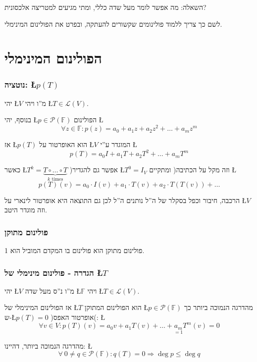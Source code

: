 \documentclass[english,hebrew]{article}
\begin{document}
השאלה: מה אפשר לומר מעל שדה כללי, ומתי מגיעים למטריצה אלכסונית?

לשם כך צריך ללמוד פולינומים שקשורים להעתקה, ובפרט את הפולינום המינימלי.

\part{הפולינום המינימלי}

\section{נוטציה: \L{$p(T)$}}

יהי \L{$V$} מ\textquotedblright ו ויהי \L{$T\in\mathcal{L}(V)$}.

בנוסף, יהי \L{$p\in\mathcal{P}(\mathbb{F})$} הפולינום \L{%
\[
\forall z\in\mathbb{F}:p(z)=a_{0}+a_{1}z+a_{2}z^{2}+\dots+a_{m}z^{m}
\]
}%

אז \L{$p(T)$} הוא האופרטור על \L{$V$} המוגדר ע\textquotedblright י
\L{%
\[
p(T)=a_{0}I+a_{1}T+a_{2}T^{2}+\dots+a_{m}T^{m}
\]
}%

כאשר \L{$T^{k}=\underset{k\text{ times}}{\underbrace{T\circ\dots\circ T}}$}
)אפשר גם להגדיר \L{$T^{0}=I_{V}$} וזה מקל על הכתיבה( ומתקיים \L{%
\[
p(T)(v)=a_{0}\cdot I(v)+a_{1}\cdot T(v)+a_{2}\cdot T\left(T\left(v\right)\right)+\dots
\]
}%

הרכבה, חיבור וכפל בסקלר של ה\textquotedblright ל נותנים ה\textquotedblright ל
לכן גם התוצאה היא אופרטור לינארי על \L{$V$} וזה מוגדר היטב.

\section{פולינום מתוקן}

פולינום מתוקן הוא פולינום בו המקדם המוביל הוא 1.

\section{הגדרה - פולינום מינימלי של \L{$T$}}

יהי \L{$V$} מ\textquotedblright ו נ\textquotedblright ס מעל שדה \L{$\mathbb{F}$}
ויהי \L{$T\in\mathcal{L}(V)$}.

אז הפולינום המינימלי של \L{$T$} הוא הפולינום המתוקן \L{$p\in\mathcal{P}(\mathbb{F})$}
מהדרגה הנמוכה ביותר כך ש-\L{$p(T)=0$} )אופרטור האפס(: \L{%
\[
\forall v\in V:p(T)(v)=a_{0}v+a_{1}T(v)+\dots+\underset{=1}{a_{m}}T^{m}(v)=0
\]
}%

מהדרגה הנמוכה ביותר, דהיינו: \L{%
\[
\forall\ 0\ne q\in\mathcal{P}(\mathbb{F}):q(T)=0\Rightarrow\deg p\le\deg q
\]
}%
\end{document}

